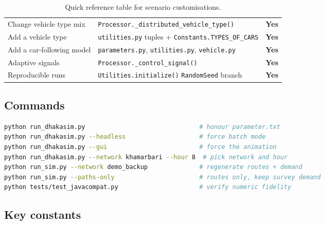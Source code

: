 \documentclass[11pt, a4paper]{article}
\newcommand{\code}[1]{\texttt{#1}}
\begin{document}
\begin{table}[h!]
\begin{tabularx}{\textwidth}{l X c}
Change vehicle type mix & \code{Processor.\_distributed\_vehicle\_type()} & \textbf{Yes} \\
Add a vehicle type & \code{utilities.py} tuples + \code{Constants.TYPES\_OF\_CARS} & \textbf{Yes} \\
Add a car-following model & \code{parameters.py}, \code{utilities.py}, \code{vehicle.py} & \textbf{Yes} \\
Adaptive signals & \code{Processor.\_control\_signal()} & \textbf{Yes} \\
Reproducible runs & \code{Utilities.initialize()} \code{RandomSeed} branch & \textbf{Yes} \\
\bottomrule
\end{tabularx}
\caption{Quick reference table for scenario customisations.}
\end{table}

\subsection{Commands}

\begin{lstlisting}[language=bash]
python run_dhakasim.py                               # honour parameter.txt
python run_dhakasim.py --headless                    # force batch mode
python run_dhakasim.py --gui                         # force the animation
python run_dhakasim.py --network khamarbari --hour 8  # pick network and hour
python run_sim.py --network demo_backup              # regenerate routes + demand
python run_sim.py --paths-only                       # routes only, keep survey demand
python tests/test_javacompat.py                      # verify numeric fidelity
\end{lstlisting}

\subsection{Key constants}
\end{document}
